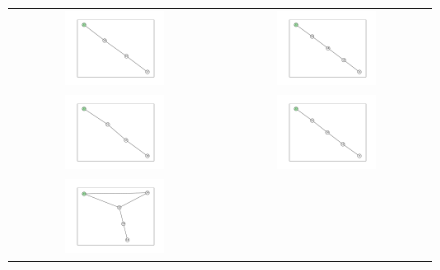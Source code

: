 \documentclass[12pt, a4paper]{extarticle}
\begin{document}
\begin{figure}\centering\begin{tabularx}{\textwidth}{cc}
\includegraphics[width=0.5\textwidth]{task11-graphlets/4_16-17-18-23.pdf} &
\includegraphics[width=0.5\textwidth]{task11-graphlets/5_10-11-16-18-23.pdf} \\
\includegraphics[width=0.5\textwidth]{task11-graphlets/4_14-16-21-23.pdf} &
\includegraphics[width=0.5\textwidth]{task11-graphlets/5_10-8-14-21-23.pdf} \\
\includegraphics[width=0.5\textwidth]{task11-graphlets/5_14-16-25-23-24.pdf} &

\end{tabularx}
\end{figure}
\end{document}
